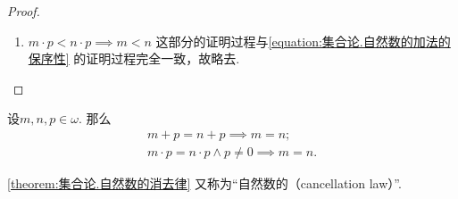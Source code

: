 \begin{theorem}
\begin{proof}
\begin{enumerate}
	\item \(m \cdot p < n \cdot p \implies m < n\)%
	这部分的证明过程与\cref{equation:集合论.自然数的加法的保序性} 的证明过程完全一致，故略去.
	\qedhere
\end{enumerate}
\end{proof}
\end{theorem}

\begin{corollary}\label{theorem:集合论.自然数的消去律}
设\(m,n,p\in\omega\).
那么\begin{gather*}
	m + p = n + p \implies m = n; \\
	m \cdot p = n \cdot p \land p \neq 0 \implies m = n.
\end{gather*}
\end{corollary}
\cref{theorem:集合论.自然数的消去律}
又称为“自然数的（cancellation law）”.

